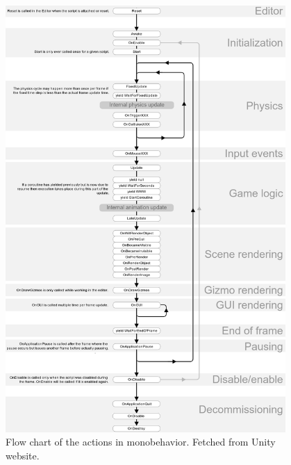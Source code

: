 \newpage
\begin{figure}[H]
    \centering
    \includegraphics[width=0.95\textwidth]{03_Background/Appendix/Images/monobehaviour_flowchart.png}
    \caption{Flow chart of the actions in monobehavior. Fetched from Unity website.}
    \label{A:MonobehaviorFlow}
\end{figure}